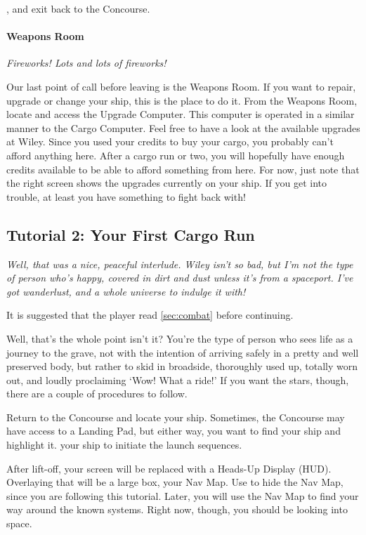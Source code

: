 \documentclass{article}
\newcommand{\key}[1]{%
  \tikz[baseline=(key.base)]{
    \node[draw=gray!50, fill=gray!5, rounded corners=2pt, inner sep=2pt, minimum height=1.5ex] (key) {\footnotesize\sffamily\bfseries #1};
  }%
}
\begin{document}
\key{LMB} \key{Done}, and exit back to the Concourse. 

\paragraph{Weapons Room}

\textit{Fireworks! Lots and lots of fireworks! }

Our last point of call before leaving is the Weapons Room. If you want to repair, upgrade or change your ship, this is the place to do it. From the Weapons Room, locate and access the Upgrade Computer. This computer is operated in a similar manner to the Cargo Computer. Feel free to have a look at the available upgrades at Wiley. Since you used your credits to buy your cargo, you probably can't afford anything here. After a cargo run or two, you will hopefully have enough credits available to be able to afford something from here. For now, just note that the right screen shows the upgrades currently on your ship. If you get into trouble, at least you have something to fight back with! 

\subsection{ Tutorial 2: Your First Cargo Run }

\textit{Well, that was a nice, peaceful interlude. Wiley isn't so bad, but I'm not the type of person who's happy, covered in dirt and dust unless it's from a spaceport. I've got wanderlust, and a whole universe to indulge it with! }

It is suggested that the player read \ref{sec:combat} before continuing. 

Well, that's the whole point isn't it? You're the type of person who sees life as a journey to the grave, not with the intention of arriving safely in a pretty and well preserved body, but rather to skid in broadside, thoroughly used up, totally worn out, and loudly proclaiming `Wow! What a ride!' If you want the stars, though, there are a couple of procedures to follow. 

Return to the Concourse and locate your ship. Sometimes, the Concourse may have access to a Landing Pad, but either way, you want to find your ship and highlight it. \key{LMB} your ship to initiate the launch sequences. 

After lift-off, your screen will be replaced with a Heads-Up Display (HUD). Overlaying that will be a large box, your Nav Map. Use \key{M} to hide the Nav Map, since you are following this tutorial. Later, you will use the Nav Map to find your way around the known systems. Right now, though, you should be looking into space. 
\end{document}
